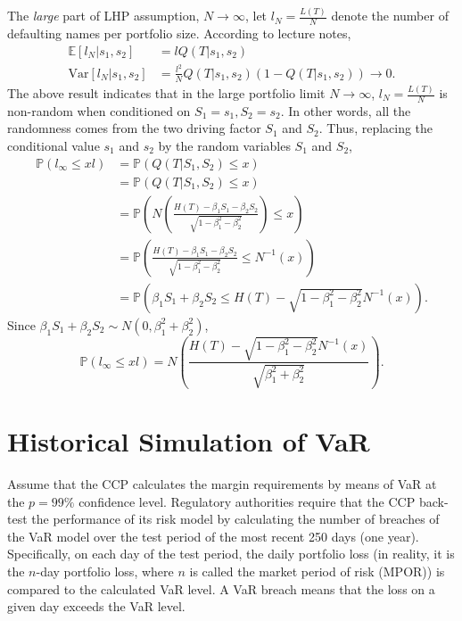 \documentclass[paper=a4, fontsize=11pt]{scrartcl} %
\numberwithin{equation}{section} %
\numberwithin{figure}{section} %
\numberwithin{table}{section} %
\begin{document}
The \textit{large} part of LHP assumption, $N\rightarrow \infty$, let $l_N =\frac{L(T)}{N}$ denote the number
of defaulting names per portfolio size. According to lecture notes,
\begin{align*}
\mathbb{E}[l_N|s_1,s_2] &= l Q(T|s_1,s_2)\\
\text{Var}[l_N|s_1,s_2] &= \frac{l^2}{N} Q(T|s_1,s_2) (1-Q(T|s_1,s_2))\rightarrow 0.
\end{align*}
The above result indicates that in the large portfolio limit $N\rightarrow \infty$, $l_N =\frac{L(T)}{N}$
is non-random when conditioned on $S_1=s_1,S_2=s_2$. In other words, all the randomness comes from the two driving
factor $S_1$ and $S_2$. Thus, replacing the conditional value $s_1$ and $s_2$ by the random variables $S_1$ and $S_2$,
\begin{align*}
\mathbb{P}\left( l_{\infty} \le xl \right) &= \mathbb{P}\left( Q(T|S_1,S_2) \le x \right)\\
&=  \mathbb{P}\left( Q(T|S_1,S_2) \le x \right) \\
&=  \mathbb{P}\left( N\left( \frac{H(T) - \beta_1 S_1 - \beta_2 S_2}{\sqrt{1-\beta_1^2 - \beta_2^2}} \right)  \le x \right) \\
&=  \mathbb{P}\left( \frac{H(T) - \beta_1 S_1 - \beta_2 S_2}{\sqrt{1-\beta_1^2 - \beta_2^2}}  \le N^{-1}(x) \right) \\
&=  \mathbb{P}\left( \beta_1 S_1 + \beta_2 S_2 \le H(T) - \sqrt{1-\beta_1^2 - \beta_2^2}N^{-1}(x) \right).
\end{align*}
Since $\beta_1 S_1 + \beta_2 S_2 \sim N\left(0,\beta_1^2+\beta_2^2\right)$,
$$
\mathbb{P}\left( l_{\infty} \le xl \right) = N\left( \frac{H(T) - \sqrt{1-\beta_1^2 - \beta_2^2}N^{-1}(x) }{\sqrt{\beta_1^2+\beta_2^2}}\right).
$$

\newpage

\section{Historical Simulation of VaR}
Assume that the CCP calculates the margin requirements by means of VaR
at the $p = 99\%$ confidence level. Regulatory authorities require that the
CCP back-test the performance of its risk model by calculating the number
of breaches of the VaR model over the test period of the most recent 250
days (one year). Specifically, on each day of the test period, the daily 
portfolio loss (in reality, it is the $n$-day portfolio loss, where $n$ 
is called the market period of risk (MPOR)) 
is compared to the calculated VaR level. A VaR breach means
that the loss on a given day exceeds the VaR level.\\
\end{document}
